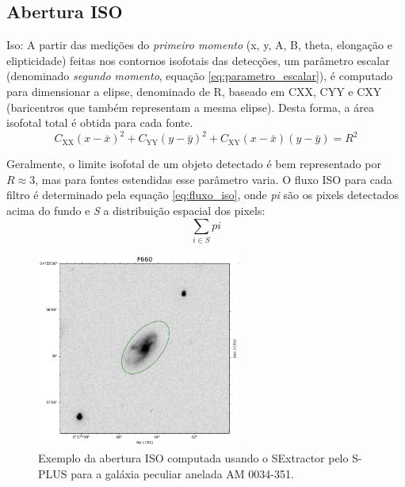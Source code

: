 \subsection{Abertura ISO}
Iso: A partir das medições do \emph{primeiro momento} (x, y, A, B, theta, elongação e elipticidade) feitas nos contornos isofotais das detecções, um parâmetro escalar (denominado \emph{segundo momento}, equação \ref{eq:parametro_escalar}), é computado para dimensionar a elipse, denominado de R, baseado em CXX, CYY e CXY (baricentros que também representam a mesma elipse). Desta forma, a área isofotal total é obtida para cada fonte.
\newcommand{\CXX}{C_{\text{XX}}}
\newcommand{\CYY}{C_{\text{YY}}}
\newcommand{\CXY}{C_{\text{XY}}}
\begin{equation} \label{eq:parametro_escalar}
\CXX(x-\bar{x})^2 + \CYY(y-\bar{y})^2 + \CXY(x-\bar{x})(y-\bar{y}) = R^2
\end{equation}

Geralmente, o limite isofotal de um objeto detectado é bem representado por $R \approx 3$, mas para fontes estendidas esse parâmetro varia. O fluxo ISO para cada filtro é determinado pela equação \ref{eq:fluxo_iso}, onde \emph{pi} são os pixels detectados acima do fundo e \emph{S} a distribuição espacial dos pixels:
\begin{equation} \label{eq:fluxo_iso}
\displaystyle
\sum_{i \in S} pi
\end{equation}

\begin{figure}[h]
  \centering 
  \includegraphics[width=0.6\textwidth]{Imagens/iso_exemplo.png} 
  \caption[Exemplo da abertura ISO para a galáxia AM 0034-351.]{Exemplo da abertura ISO computada usando o SExtractor pelo S-PLUS para a galáxia peculiar anelada AM 0034-351.}
  \label{fig:iso_exemplo} 
\end{figure}

